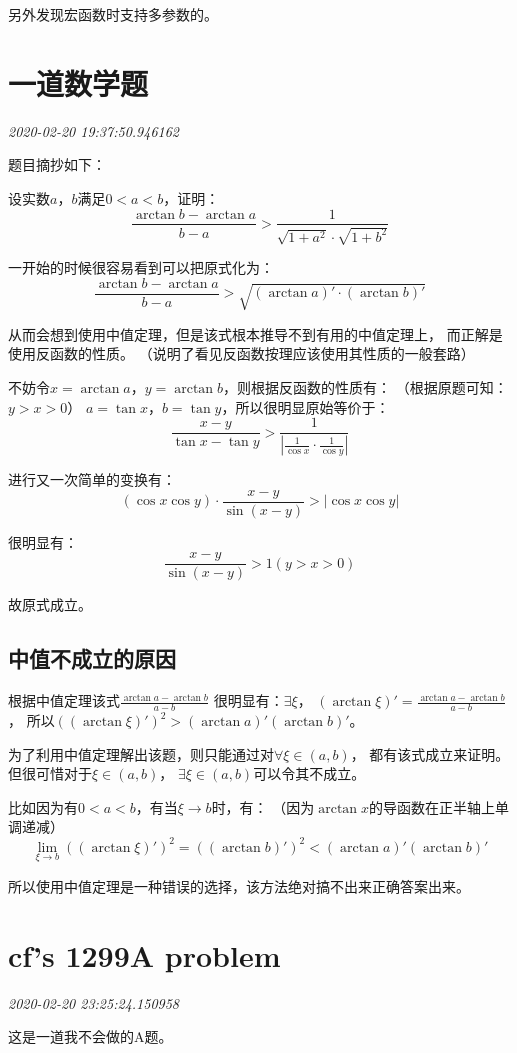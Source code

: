 \documentclass{peterlitsdoc}
\newcommand{\timetx}[1]
    {\par\noindent\emph{\pltgray\small #1}\vspace{2em}}
\begin{document}
另外发现宏函数时支持多参数的。


\section{一道数学题}\timetx{2020-02-20 19:37:50.946162}

题目摘抄如下：

设实数$a$，$b$满足$0<a<b$，证明：
$$\frac{\arctan b-\arctan a}{b-a}
>\frac{1}{\sqrt{1+a^2}\cdot\sqrt{1+b^2}}$$

一开始的时候很容易看到可以把原式化为：
$$\frac{\arctan b-\arctan a}{b-a}>
\sqrt{(\arctan a)'\cdot(\arctan b)'}$$

从而会想到使用中值定理，但是该式根本推导不到有用的中值定理上，
而正解是使用反函数的性质。
（说明了看见反函数按理应该使用其性质的一般套路）

不妨令$x=\arctan a$，$y=\arctan b$，则根据反函数的性质有：
（根据原题可知：$y>x>0$）
$a=\tan x$，$b=\tan y$，所以很明显原始等价于：
$$\frac{x-y}{\tan x-\tan y}>
\frac{1}{|\frac{1}{\cos x}\cdot\frac{1}{\cos y}|}$$

进行又一次简单的变换有：
$$(\cos x\cos y)\cdot\frac{x-y}{\sin(x-y)}>|\cos x\cos y|$$

很明显有：
$$\frac{x-y}{\sin(x-y)}>1(y>x>0)$$

故原式成立。

\subsection{中值不成立的原因}
根据中值定理该式$\frac{\arctan a-\arctan b}{a-b}$
很明显有：$\exists \xi$，
$(\arctan\xi)'=\frac{\arctan a-\arctan b}{a-b}$，
所以$((\arctan\xi)')^2>(\arctan a)'(\arctan b)'$。

为了利用中值定理解出该题，则只能通过对$\forall\xi\in(a, b)$，
都有该式成立来证明。但很可惜对于$\xi\in(a, b)$，
$\exists\xi\in(a, b)$可以令其不成立。

比如因为有$0<a<b$，有当$\xi\to b$时，有：
（因为$\arctan x$的导函数在正半轴上单调递减）
$$\lim_{\xi\to b}((\arctan\xi)')^2=
((\arctan b)')^2<
(\arctan a)'(\arctan b)'$$

所以使用中值定理是一种错误的选择，该方法绝对搞不出来正确答案出来。


\section{cf's 1299A problem}\timetx{2020-02-20 23:25:24.150958}

这是一道我不会做的A题。
\end{document}
